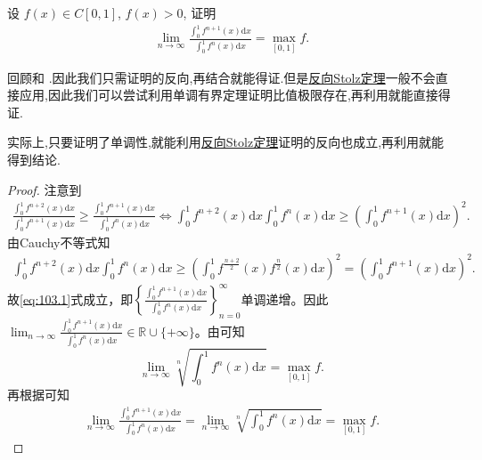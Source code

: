 \documentclass[../../main.tex]{subfiles}%
\begin{document}
\begin{example}
设 $f(x) \in C[0,1]$, $f(x) > 0$, 证明
\begin{align*}
\lim_{n \to \infty} \frac{\int_0^1 f^{n+1}(x) \mathrm{d}x}{\int_0^1 f^n(x) \mathrm{d}x} = \max_{[0,1]} f.
\end{align*}
\end{example}
\begin{note}
回顾和
.因此我们只需证明的反向,再结合就能得证.但是\hyperref[theorem:反向Stolz定理]{反向Stolz定理}一般不会直接应用,因此我们可以尝试利用单调有界定理证明比值极限存在,再利用就能直接得证.

实际上,只要证明了单调性,就能利用\hyperref[theorem:反向Stolz定理]{反向Stolz定理}证明的反向也成立,再利用就能得到结论.
\end{note}
\begin{proof}

注意到
\begin{align}
\frac{\int_0^1 f^{n+2}(x) \mathrm{d}x}{\int_0^1 f^{n+1}(x) \mathrm{d}x} \geqslant \frac{\int_0^1 f^{n+1}(x) \mathrm{d}x}{\int_0^1 f^n(x) \mathrm{d}x} \Longleftrightarrow \int_0^1 f^{n+2}(x) \mathrm{d}x \int_0^1 f^n(x) \mathrm{d}x \geqslant \left( \int_0^1 f^{n+1}(x) \mathrm{d}x \right)^2.\label{eq:103.1}
\end{align}
由Cauchy不等式知
\begin{align*}
\int_0^1 f^{n+2}(x) \mathrm{d}x \int_0^1 f^n(x) \mathrm{d}x \geqslant \left( \int_0^1 f^{\frac{n+2}{2}}(x) f^{\frac{n}{2}}(x) \mathrm{d}x \right)^2 = \left( \int_0^1 f^{n+1}(x) \mathrm{d}x \right)^2.
\end{align*}
故\eqref{eq:103.1}式成立，即$\left\{ \frac{\int_0^1 f^{n+1}(x) \mathrm{d}x}{\int_0^1 f^n(x) \mathrm{d}x} \right\}_{n=0}^{\infty}$单调递增。因此$\lim_{n \to \infty} \frac{\int_0^1 f^{n+1}(x) \mathrm{d}x}{\int_0^1 f^n(x) \mathrm{d}x} \in \mathbb{R} \cup \{ +\infty \}$。由可知$$\lim_{n \to \infty} \sqrt[n]{\int_0^1 f^n(x) \mathrm{d}x} = \max_{[0,1]} f.$$再根据可知
\begin{align*}
\lim_{n \to \infty} \frac{\int_0^1 f^{n+1}(x) \mathrm{d}x}{\int_0^1 f^n(x) \mathrm{d}x} = \lim_{n \to \infty} \sqrt[n]{\int_0^1 f^n(x) \mathrm{d}x} = \max_{[0,1]} f.
\end{align*}

\end{proof}
\end{document}
